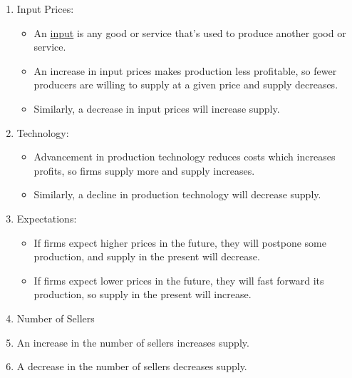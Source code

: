 	\begin{enumerate}
	
	\item Input Prices: 
	
		\begin{itemize}
		
		\item An \underline{input} is any good or service that's used to produce another good or service.
		
		\item An increase in input prices makes production less profitable, so fewer producers are willing to supply at a given price and supply decreases.
		
		\item Similarly, a decrease in input prices will increase supply.
		
		\end{itemize}
		
	\item Technology:
	
		\begin{itemize}
		
		\item Advancement in production technology reduces costs which increases profits, so firms supply more and supply increases.
		
		\item Similarly, a decline in production technology will decrease supply.
		
		\end{itemize}
		
	\item Expectations:
		
		\begin{itemize}
		
		\item If firms expect higher prices in the future, they will postpone some production, and supply in the present will decrease.
		
		\item If firms expect lower prices in the future, they will fast forward its production, so supply in the present will increase.
		
		\end{itemize}
		
	\item Number of Sellers
	
		\item An increase in the number of sellers increases supply.
		
		\item A decrease in the number of sellers decreases supply.
	
	\end{enumerate}

